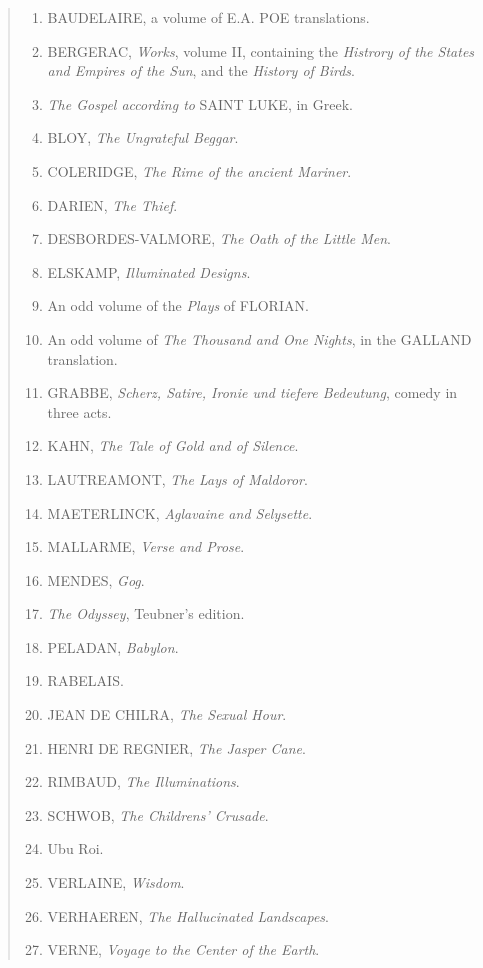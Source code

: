 \begin{quote}
  \begin{enumerate}
    \item BAUDELAIRE, a volume of E.A. POE translations.
    \item BERGERAC, \emph{Works}, volume II, containing the \emph{Histrory of the States and Empires of the Sun}, and the \emph{History of Birds}.
    \item \emph{The Gospel according to} SAINT LUKE, in Greek.
    \item BLOY, \emph{The Ungrateful Beggar}.
    \item COLERIDGE, \emph{The Rime of the ancient Mariner}.
    \item DARIEN, \emph{The Thief}.
    \item DESBORDES-VALMORE, \emph{The Oath of the Little Men}.
    \item ELSKAMP, \emph{Illuminated Designs}.
    \item An odd volume of the \emph{Plays} of FLORIAN\@.
    \item An odd volume of \emph{The Thousand and One Nights}, in the GALLAND translation.
    \item GRABBE, \emph{Scherz, Satire, Ironie und tiefere Bedeutung}, comedy in three acts.
    \item KAHN, \emph{The Tale of Gold and of Silence}.
    \item LAUTREAMONT, \emph{The Lays of Maldoror}.
    \item MAETERLINCK, \emph{Aglavaine and Selysette}.
    \item MALLARME, \emph{Verse and Prose}.
    \item MENDES, \emph{Gog}.
    \item \emph{The Odyssey}, Teubner's edition.
    \item PELADAN, \emph{Babylon}.
    \item RABELAIS\@.
    \item JEAN DE CHILRA, \emph{The Sexual Hour}.
    \item HENRI DE REGNIER, \emph{The Jasper Cane}.
    \item RIMBAUD, \emph{The Illuminations}.
    \item SCHWOB, \emph{The Childrens' Crusade}.
    \item Ubu Roi.
    \item VERLAINE, \emph{Wisdom}.
    \item VERHAEREN, \emph{The Hallucinated Landscapes}.
    \item VERNE, \emph{Voyage to the Center of the Earth}.
  \end{enumerate}
\end{quote}

